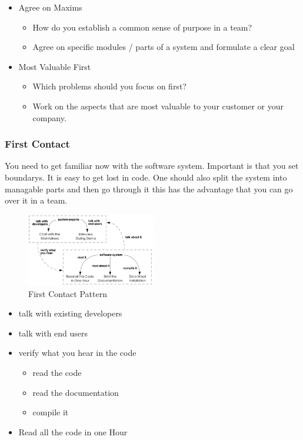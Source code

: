 \begin{itemize}
\tightlist
\item
  Agree on Maxims

  \begin{itemize}
  \tightlist
  \item
    How do you establish a common sense of purpose in a team?
  \item
    Agree on specific modules / parts of a system and formulate a clear
    goal
  \end{itemize}
\item
  Most Valuable First

  \begin{itemize}
  \tightlist
  \item
    Which problems should you focus on first?
  \item
    Work on the aspects that are most valuable to your customer or your
    company.
  \end{itemize}
\end{itemize}

\hypertarget{first-contact}{%
\subsubsection{First Contact}\label{first-contact}}

You need to get familiar now with the software system.
Important is that you set boundarys. It is easy to get lost in code. One should also split the system into managable parts and then go through it this has the advantage that you can go over it in a team.

\begin{figure}[H]
\centering
\includegraphics[width=0.5\textwidth]{figures/FirstContact.PNG}
\caption{First Contact Pattern}
\end{figure}



\begin{itemize}
\tightlist
\item
  talk with existing developers
\item
  talk with end users
\item
  verify what you hear in the code

  \begin{itemize}
  \tightlist
  \item
    read the code
  \item
    read the documentation
  \item
    compile it
  \end{itemize}
  \item Read all the code in one Hour
\end{itemize}



